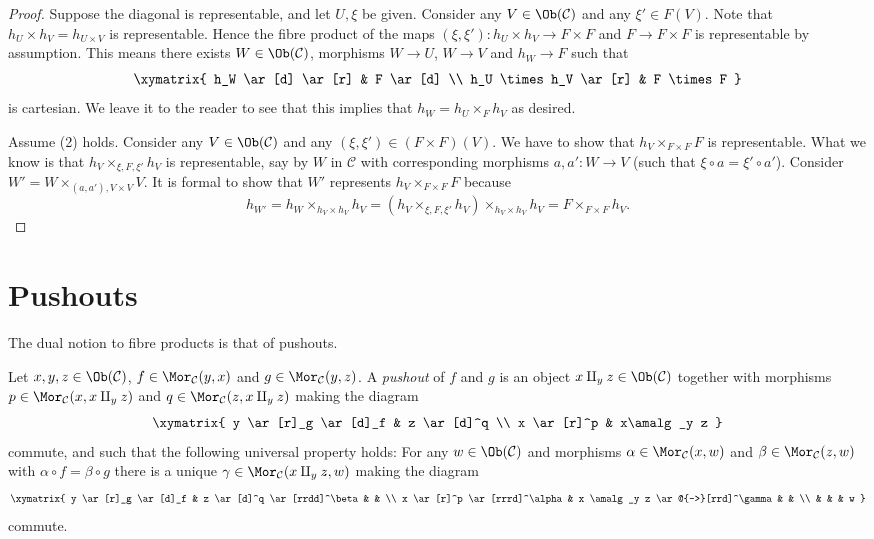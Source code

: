 \begin{proof}
Suppose the diagonal is representable, and let $U, \xi$ be given.
Consider any $V \in \Ob(\mathcal{C})$ and any
$\xi' \in F(V)$. Note that $h_U \times h_V = h_{U \times V}$
is representable. Hence the fibre product of the maps
$(\xi, \xi') : h_U \times h_V \to F \times F$
and $F \to F \times F$ is representable by assumption.
This means there exists $W \in \Ob(\mathcal{C})$,
morphisms $W \to U$, $W \to V$ and $h_W \to F$ such that
$$
\xymatrix{
h_W \ar[d] \ar[r] & F \ar[d] \\
h_U \times h_V \ar[r] & F \times F
}
$$
is cartesian. We leave it to the reader to see that this
implies that $h_W = h_U \times_F h_V$ as desired.

\medskip\noindent
Assume (2) holds. Consider any $V \in \Ob(\mathcal{C})$
and any $(\xi, \xi') \in (F \times F)(V)$. We have to show that
$h_V \times_{F \times F} F$ is representable. What we know is that
$h_V \times_{\xi, F, \xi'} h_V$ is representable, say by $W$
in $\mathcal{C}$ with corresponding morphisms $a, a' : W \to V$
(such that $\xi \circ a = \xi' \circ a'$).
Consider $W' = W \times_{(a, a'), V \times V} V$.
It is formal to show that $W'$ represents $h_V \times_{F \times F} F$
because
$$
h_{W'} =  h_W \times_{h_V \times h_V} h_V
= (h_V \times_{\xi, F, \xi'} h_V) \times_{h_V \times h_V} h_V
= F \times_{F \times F} h_V.
$$
\end{proof}









\section{Pushouts}
\label{section-pushouts}

\noindent
The dual notion to fibre products is that of pushouts.

\begin{definition}
\label{definition-pushouts}
Let $x, y, z\in \Ob(\mathcal{C})$,
$f\in \Mor_\mathcal{C}(y, x)$
and $g\in \Mor_{\mathcal C}(y, z)$.
A {\it pushout} of $f$ and $g$ is
an object $x\amalg_y z\in \Ob(\mathcal{C})$
together with morphisms
$p\in \Mor_{\mathcal C}(x, x\amalg_y z)$ and
$q\in\Mor_{\mathcal C}(z, x\amalg_y z)$ making the diagram
$$
\xymatrix{
y \ar[r]_g \ar[d]_f & z \ar[d]^q \\
x \ar[r]^p & x\amalg_y z
}
$$
commute, and such that the following universal property holds:
For any $w\in \Ob(\mathcal{C})$ and morphisms
$\alpha \in \Mor_{\mathcal C}(x, w)$ and
$\beta \in \Mor_\mathcal{C}(z, w)$ with
$\alpha \circ f = \beta \circ g$ there is a unique
$\gamma\in \Mor_{\mathcal C}(x\amalg_y z, w)$ making
the diagram
$$
\xymatrix{
y \ar[r]_g \ar[d]_f & z \ar[d]^q \ar[rrdd]^\beta & & \\
x \ar[r]^p \ar[rrrd]^\alpha & x \amalg_y z  \ar@{-->}[rrd]^\gamma & & \\
& & & w
}
$$
commute.
\end{definition}

